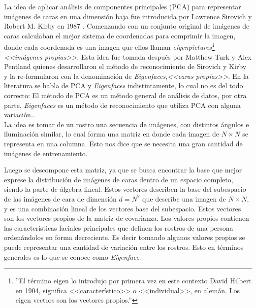 \documentclass[letterpaper,12pt]{article}
\begin{document}
La idea de aplicar análisis de componentes principales (PCA) para representar imágenes de caras en una dimensión baja fue introducida por Lawrence Sirovich y Robert M. Kirby en 1987 \cite{Sirovich}. Comenzando con un conjunto original de imágenes de caras calculaban el mejor sistema de coordenadas para comprimir la imagen, donde cada coordenada es una imagen que ellos llaman \emph{eigenpictures\footnote{''El término eigen lo introdujo por primera vez en este contexto David Hilbert en 1904, significa <<característico>> o <<individual>>, en alemán. Los eigen vectors son los vectores propios.''}} \emph{<<imágenes propias>>}. Esta idea fue tomada después por Matthew Turk y Alex Pentland \cite{Turk} quienes desarrollaron el método de reconocimiento de Sirovich y Kirby y la re-formularon con la denominación de \emph{Eigenfaces},\emph{<<caras propias>>}. En la literatura se habla de PCA y \emph{Eigenfaces} indistintamente, lo cual no es del todo correcto: El método de PCA es un método general de análisis de datos, por otra parte, \emph{Eigenfaces} es un método de reconocimiento que utiliza PCA con alguna variación.\cite{VniversitatDValencia}.\\

La idea es tomar de un rostro una secuencia de imágenes, con distintos ángulos e iluminación similar, lo cual forma una matriz en donde cada imagen de $N\times N$ se representa en una columna. Esto nos dice que se necesita una gran cantidad de imágenes de entrenamiento.

 Luego se descompone esta matriz, ya que se busca encontrar la base que mejor exprese la distribución de imágenes de caras dentro de un espacio completo, siendo la parte de álgebra lineal. Estos vectores describen la base del subespacio de las imágenes de cara de dimensión $d=N^2$ que describe una imagen de $N \times N$, y es una combinación lineal de los vectores base del subespacio. Estos vectores son los vectores propios de la matriz de covarianza. Los valores propios contienen las características faciales principales que definen los rostros de una persona ordenándolos en forma decreciente. Es decir tomando algunos valores propios se puede representar una cantidad de variación entre los rostros. Esto en términos  generales es lo que se conoce como \emph{Eigenface}.
 
\end{document}
